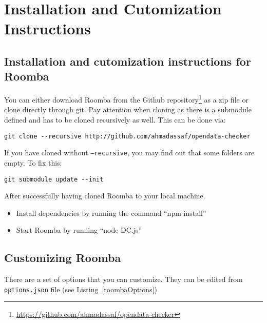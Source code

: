 \chapter{Installation and Cutomization Instructions}
\label{appendix:appendixD}

\section{Installation and cutomization instructions for Roomba}
\label{section:installation_roomba}

You can either download Roomba from the Github repository\footnote{\url{https://github.com/ahmadassaf/opendata-checker}} as a zip file or clone directly through git. Pay attention when cloning as there is a submodule defined and has to be cloned recursively as well. This can be done via:

\begin{verbatim}
git clone --recursive http://github.com/ahmadassaf/opendata-checker
\end{verbatim}

If you have cloned without \texttt{--recursive}, you may find out that some folders are empty. To fix this:
\begin{verbatim}
git submodule update --init
\end{verbatim}

After successfully having cloned Roomba to your local machine.
\begin{itemize}
	\item Install dependencies by running the command ``npm install''
	\item Start Roomba by running ``node DC.js''
\end{itemize}

\section{Customizing Roomba}

There are a set of options that you can customize. They can be edited from \texttt{options.json} file (see Listing~\ref{roombaOptions})




